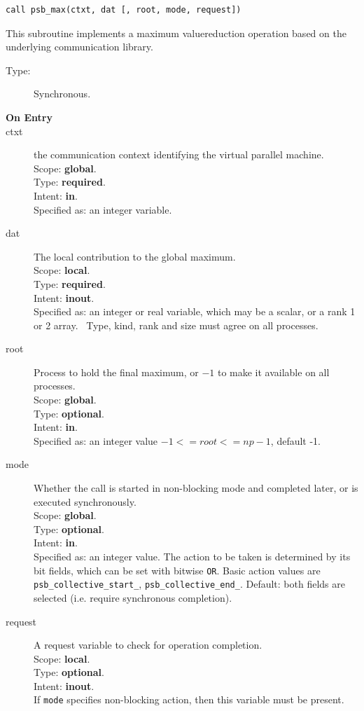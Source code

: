 \begin{verbatim}
call psb_max(ctxt, dat [, root, mode, request])
\end{verbatim}

This subroutine implements a maximum valuereduction
operation based on the underlying communication library. 
\begin{description}
\item[Type:] Synchronous.
\item[\bf  On Entry ]
\item[ctxt] the communication context identifying the virtual
  parallel machine.\\
Scope: {\bf global}.\\
Type: {\bf required}.\\
Intent: {\bf in}.\\
Specified as: an integer variable.
\item[dat] The local contribution to the global maximum.\\
Scope: {\bf local}.\\
Type: {\bf required}.\\
Intent: {\bf inout}.\\
Specified as: an integer or  real variable, which may be a
scalar, or a rank 1 or 2 array. \
Type, kind, rank and size must agree on all processes.
\item[root] Process to hold the final maximum, or $-1$ to make it available
  on all processes.\\
Scope: {\bf global}.\\
Type: {\bf optional}.\\
Intent: {\bf in}.\\
Specified as: an integer value $-1<= root <= np-1$, default -1. \\
\item[mode] Whether the call is started in non-blocking mode and completed
  later, or is executed synchronously.\\
Scope: {\bf global}.\\
Type: {\bf optional}.\\
Intent: {\bf in}.\\
Specified as: an integer value. The action to be taken is determined
by its bit fields, which can be set with bitwise \verb|OR|. Basic
action values are \verb|psb_collective_start_|, \verb|psb_collective_end_|.
Default:  both fields are selected (i.e. require synchronous completion).\\
\item[request] A request variable to check for operation completion.\\
Scope: {\bf local}.\\
Type: {\bf optional}.\\
Intent: {\bf inout}.\\
If \verb|mode| specifies non-blocking action, then this
variable must be present.
\end{description}


